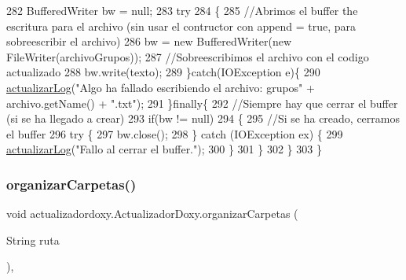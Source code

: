 \begin{DoxyCode}
282         BufferedWriter bw = null;
283         \textcolor{keywordflow}{try}
284         \{
285             \textcolor{comment}{//Abrimos el buffer the escritura para el archivo (sin usar el contructor con append = true,
       para sobreescribir el archivo)}
286             bw = \textcolor{keyword}{new} BufferedWriter(\textcolor{keyword}{new} FileWriter(archivoGrupos));
287             \textcolor{comment}{//Sobreescribimos el archivo con el codigo actualizado}
288             bw.write(texto);
289         \}\textcolor{keywordflow}{catch}(IOException e)\{
290             \mbox{\hyperlink{classactualizadordoxy_1_1_actualizador_doxy_a1ad41046efbaaf40a60b34da347f9090}{actualizarLog}}(\textcolor{stringliteral}{"Algo ha fallado escribiendo el archivo: grupos"} + archivo.getName()
       + \textcolor{stringliteral}{".txt"});
291         \}\textcolor{keywordflow}{finally}\{
292             \textcolor{comment}{//Siempre hay que cerrar el buffer (si se ha llegado a crear)}
293             \textcolor{keywordflow}{if}(bw != null)
294             \{
295                 \textcolor{comment}{//Si se ha creado, cerramos el buffer}
296                 \textcolor{keywordflow}{try} \{
297                     bw.close();
298                 \} \textcolor{keywordflow}{catch} (IOException ex) \{
299                     \mbox{\hyperlink{classactualizadordoxy_1_1_actualizador_doxy_a1ad41046efbaaf40a60b34da347f9090}{actualizarLog}}(\textcolor{stringliteral}{"Fallo al cerrar el buffer."});
300                 \}
301             \}
302         \}
303     \}
\end{DoxyCode}
\mbox{\label{classactualizadordoxy_1_1_actualizador_doxy_ada45f34eba1b90fde37a09726ff2de59}} 
\subsubsection{\texorpdfstring{organizar\+Carpetas()}{organizarCarpetas()}}
{\footnotesize\ttfamily void actualizadordoxy.\+Actualizador\+Doxy.\+organizar\+Carpetas (\begin{DoxyParamCaption}\item[{String}]{ruta }\end{DoxyParamCaption})\hspace{0.3cm}{\ttfamily [inline]}, {\ttfamily [private]}}


